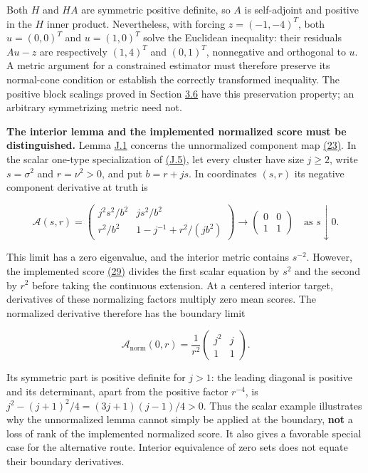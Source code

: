 \documentclass[11pt]{article}
\begin{document}
Both \(H\) and \(HA\) are symmetric positive definite, so \(A\) is self-adjoint and positive in the \(H\) inner product. Nevertheless, with forcing \(z=(-1,-4)^T\), both \(u=(0,0)^T\) and \(u=(1,0)^T\) solve the Euclidean inequality: their residuals \(Au-z\) are respectively \((1,4)^T\) and \((0,1)^T\), nonnegative and orthogonal to \(u\). A metric argument for a constrained estimator must therefore preserve its normal-cone condition or establish the correctly transformed inequality. The positive block scalings proved in Section \hyperref[sec:3.6]{3.6} have this preservation property; an arbitrary symmetrizing metric need not.

\textbf{The interior lemma and the implemented normalized score must be distinguished.} Lemma \hyperref[res:Lemma-J.1]{J.1} concerns the unnormalized component map \hyperref[eq:23]{(23)}. In the scalar one-type specialization of \hyperref[eq:J.5]{(J.5)}, let every cluster have size \(j\geq2\), write \(s=\sigma^2\) and \(r=\nu^2>0\), and put \(b=r+js\). In coordinates \((s,r)\) its negative component derivative at truth is

\begin{equation*}
\mathcal A(s,r)=
\begin{pmatrix}
j^2s^2/b^2&js^2/b^2\\
r^2/b^2&1-j^{-1}+r^2/(jb^2)
\end{pmatrix}
\longrightarrow
\begin{pmatrix}0&0\\1&1\end{pmatrix}
\quad\text{as }s\downarrow0.
\end{equation*}

This limit has a zero eigenvalue, and the interior metric contains \(s^{-2}\). However, the implemented score \hyperref[eq:29]{(29)} divides the first scalar equation by \(s^2\) and the second by \(r^2\) before taking the continuous extension. At a centered interior target, derivatives of these normalizing factors multiply zero mean scores. The normalized derivative therefore has the boundary limit

\begin{equation*}
\mathcal A_{\mathrm{norm}}(0,r)
=\frac1{r^2}\begin{pmatrix}j^2&j\\1&1\end{pmatrix}.
\end{equation*}

Its symmetric part is positive definite for \(j>1\): the leading diagonal is positive and its determinant, apart from the positive factor \(r^{-4}\), is \(j^2-(j+1)^2/4=(3j+1)(j-1)/4>0\). Thus the scalar example illustrates why the unnormalized lemma cannot simply be applied at the boundary, \textbf{not} a loss of rank of the implemented normalized score. It also gives a favorable special case for the alternative route. Interior equivalence of zero sets does not equate their boundary derivatives.
\end{document}
